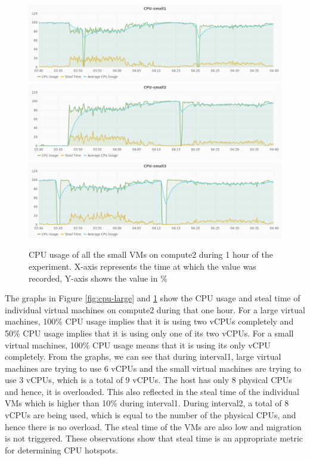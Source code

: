 \begin{figure}[!htbp]
  \centering
  \includegraphics[width=\textwidth]{cpu-small1.png}
  \includegraphics[width=\textwidth]{cpu-small2.png}
  \includegraphics[width=\textwidth]{cpu-small3.png}
  \caption{CPU usage of all the small VMs on compute2 during 1 hour of the experiment. X-axis represents the time at which the value was recorded, Y-axis shows the value in \%}\label{fig:cpu-small}
\end{figure}

The graphs in Figure \ref{fig:cpu-large} and \ref{fig:cpu-small} show the CPU usage and steal time of individual virtual machines on compute2 during that one hour. For a large virtual machines, 100\% CPU usage implies that it is using two vCPUs completely and 50\% CPU usage implies that it is using only one of its two vCPUs. For a small virtual machines, 100\% CPU usage means that it is using its only vCPU completely. From the graphs, we can see that during interval1, large virtual machines are trying to use 6 vCPUs and the small virtual machines are trying to use 3 vCPUs, which is a total of 9 vCPUs. The host has only 8 physical CPUs and hence, it is overloaded. This also reflected in the steal time of the individual VMs which is higher than 10\% during interval1. During interval2, a total of 8 vCPUs are being used, which is equal to the number of the physical CPUs, and hence there is no overload. The steal time of the VMs are also low and migration is not triggered. These observations show that steal time is an appropriate metric for determining CPU hotspots.



